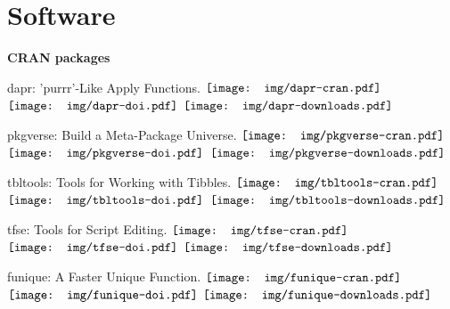 \section{Software}

  \textbf{CRAN packages}
    \begin{innerlist}

      \item dapr: 'purrr'-Like Apply Functions.
     \href{https://cran.r-project.org/package=dapr}{$\vcenter{\hbox{\texttt{[image: img/dapr-cran.pdf]}}}$}
      \href{https://doi.org/10.5281/zenodo.2528504}{$\vcenter{\hbox{\texttt{[image: img/dapr-doi.pdf]}}}$}
                                                    $\vcenter{\hbox{\texttt{[image: img/dapr-downloads.pdf]}}}$

      \item  pkgverse: Build a Meta-Package Universe.
 \href{https://cran.r-project.org/package=pkgverse}{$\vcenter{\hbox{\texttt{[image: img/pkgverse-cran.pdf]}}}$}
      \href{https://doi.org/10.5281/zenodo.2528500}{$\vcenter{\hbox{\texttt{[image: img/pkgverse-doi.pdf]}}}$}
                                                    $\vcenter{\hbox{\texttt{[image: img/pkgverse-downloads.pdf]}}}$

      \item tbltools: Tools for Working with Tibbles.
 \href{https://cran.r-project.org/package=tbltools}{$\vcenter{\hbox{\texttt{[image: img/tbltools-cran.pdf]}}}$}
      \href{https://doi.org/10.5281/zenodo.2528491}{$\vcenter{\hbox{\texttt{[image: img/tbltools-doi.pdf]}}}$}
                                                    $\vcenter{\hbox{\texttt{[image: img/tbltools-downloads.pdf]}}}$

      \item tfse: Tools for Script Editing.
     \href{https://cran.r-project.org/package=tfse}{$\vcenter{\hbox{\texttt{[image: img/tfse-cran.pdf]}}}$}
      \href{https://doi.org/10.5281/zenodo.2528495}{$\vcenter{\hbox{\texttt{[image: img/tfse-doi.pdf]}}}$}
                                                    $\vcenter{\hbox{\texttt{[image: img/tfse-downloads.pdf]}}}$

      \item funique: A Faster Unique Function.
  \href{https://cran.r-project.org/package=funique}{$\vcenter{\hbox{\texttt{[image: img/funique-cran.pdf]}}}$}
      \href{https://doi.org/10.5281/zenodo.2528502}{$\vcenter{\hbox{\texttt{[image: img/funique-doi.pdf]}}}$}
                                                    $\vcenter{\hbox{\texttt{[image: img/funique-downloads.pdf]}}}$


\end{innerlist}
